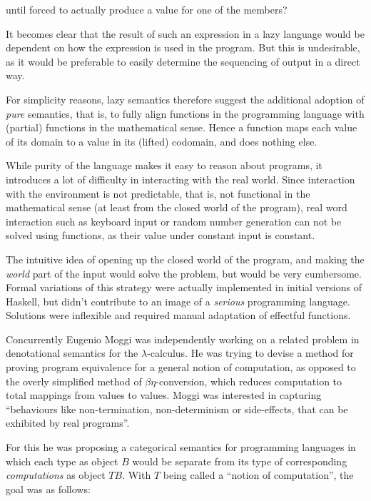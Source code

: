 until forced to actually produce a value for one of the members?

It becomes clear that the result of such an expression in a lazy
language would be dependent on how the expression is used in the
program. But this is undesirable, as it would be preferable to easily
determine the sequencing of output in a direct way.

For simplicity reasons, lazy semantics therefore suggest the additional
adoption of \emph{pure} semantics\smartcite[p. 12-8]{hask-history}, that is, to
fully align functions in the programming language with (partial) functions in
the mathematical sense.  Hence a function maps each value of its domain to a
value in its (lifted) codomain, and does nothing else.

While purity of the language makes it easy to reason about programs, it
introduces a lot of difficulty in interacting with the real world. Since
interaction with the environment is not predictable, that is, not
functional in the mathematical sense (at least from the closed world of
the program), real word interaction such as keyboard input or random
number generation can not be solved using functions, as their value
under constant input is constant.

The intuitive idea of opening up the closed world of the program, and
making the \emph{world} part of the input would solve the problem, but
would be very cumbersome. Formal variations of this strategy were
actually implemented in initial versions of Haskell, but didn't
contribute to an image of a \emph{serious} programming language.
Solutions were inflexible and required manual adaptation of effectful
functions.

Concurrently Eugenio Moggi was independently working on a related problem in
denotational semantics for the $\lambda$-calculus. He was trying to devise a
method for proving program equivalence for a general notion of computation, as
opposed to the overly simplified method of $\beta\eta$-conversion, which
reduces computation to total mappings from values to values. Moggi was
interested in capturing ``behaviours like non-termination, non-determinism or
side-effects, that can be exhibited by real programs''\smartcite[p.
1]{moggi-89}.

For this he was proposing a categorical semantics for programming languages in
which each type as object $B$ would be separate from its type of corresponding
\emph{computations} as object $TB$. With $T$ being called a ``notion of
computation'', the goal was as follows\smartcite[p. 2]{moggi-89}:

